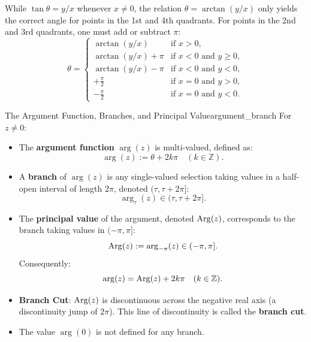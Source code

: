 \begin{remark}
While $\tan\theta = y/x$ whenever $x \neq 0$, the relation $\theta = \arctan(y/x)$ only yields the correct angle for points in the 1st and 4th quadrants. For points in the 2nd and 3rd quadrants, one must add or subtract $\pi$:
\begin{equation}
\theta = \begin{cases}
\arctan(y/x) & \text{if } x > 0, \\
\arctan(y/x) + \pi & \text{if } x < 0 \text{ and } y \ge 0, \\
\arctan(y/x) - \pi & \text{if } x < 0 \text{ and } y < 0, \\
+\frac{\pi}{2} & \text{if } x = 0 \text{ and } y > 0, \\
-\frac{\pi}{2} & \text{if } x = 0 \text{ and } y < 0.
\end{cases}
\end{equation}
\end{remark}

\begin{definition}{The Argument Function, Branches, and Principal Value}{argument_branch}
For $z \neq 0$:
\begin{itemize}
    \item The \textbf{argument function} $\arg(z)$ is multi-valued, defined as:
    \begin{equation}
    \arg(z) := \theta + 2k\pi \quad (k \in \mathbb{Z}).
    \end{equation}
    \item A \textbf{branch} of $\arg(z)$ is any single-valued selection taking values in a half-open interval of length $2\pi$, denoted $(\tau, \tau + 2\pi]$:
    \begin{equation}
    \arg_\tau(z) \in (\tau, \tau + 2\pi].
    \end{equation}
    \item The \textbf{principal value} of the argument, denoted $\operatorname{Arg}(z)$, corresponds to the branch taking values in $(-\pi, \pi]$:
    \begin{equation}
    \operatorname{Arg}(z) := \operatorname{arg}_{-\pi}(z) \in (-\pi, \pi].
    \end{equation}
    Consequently:
    \begin{equation}
    \operatorname{arg}(z) = \operatorname{Arg}(z) + 2k\pi \quad (k \in \mathbb{Z}).
    \end{equation}
    \item \textbf{Branch Cut}: $\operatorname{Arg}(z)$ is discontinuous across the negative real axis (a discontinuity jump of $2\pi$). This line of discontinuity is called the \textbf{branch cut}.
    \item The value $\arg(0)$ is not defined for any branch.
\end{itemize}
\end{definition}

